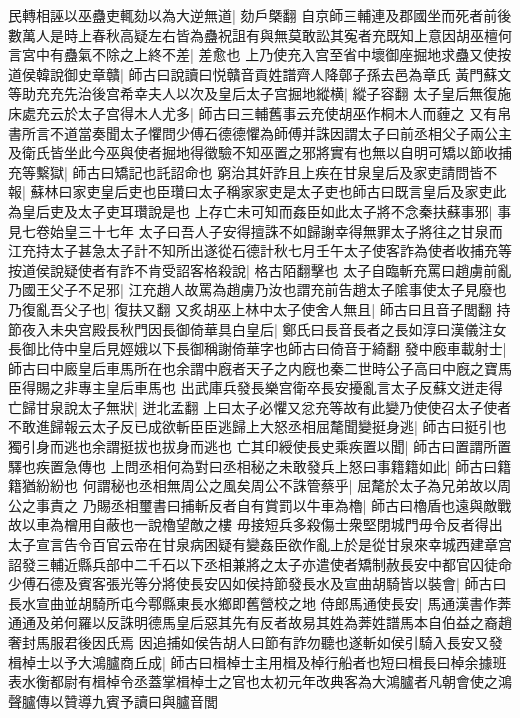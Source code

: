 民轉相誣以巫蠱吏輒劾以為大逆無道|{
	劾戶槩翻}
自京師三輔連及郡國坐而死者前後數萬人是時上春秋高疑左右皆為蠱祝詛有與無莫敢訟其寃者充既知上意因胡巫檀何言宮中有蠱氣不除之上終不差|{
	差愈也}
上乃使充入宫至省中壞御座掘地求蠱又使按道侯韓說御史章贛|{
	師古曰說讀曰悦贛音貢姓譜齊人降鄣子孫去邑為章氏}
黃門蘇文等助充充先治後宫希幸夫人以次及皇后太子宫掘地縱横|{
	縱子容翻}
太子皇后無復施床處充云於太子宫得木人尤多|{
	師古曰三輔舊事云充使胡巫作桐木人而薶之}
又有帛書所言不道當奏聞太子懼問少傅石德德懼為師傅并誅因謂太子曰前丞相父子兩公主及衛氏皆坐此今巫與使者掘地得徵驗不知巫置之邪將實有也無以自明可矯以節收捕充等繫獄|{
	師古曰矯記也託詔命也}
窮治其奸詐且上疾在甘泉皇后及家吏請問皆不報|{
	蘇林曰家吏皇后吏也臣瓚曰太子稱家家吏是太子吏也師古曰既言皇后及家吏此為皇后吏及太子吏耳瓚說是也}
上存亡未可知而姦臣如此太子將不念秦扶蘇事邪|{
	事見七卷始皇三十七年}
太子曰吾人子安得擅誅不如歸謝幸得無罪太子將往之甘泉而江充持太子甚急太子計不知所出遂從石德計秋七月壬午太子使客詐為使者收捕充等按道侯說疑使者有詐不肯受詔客格殺說|{
	格古陌翻擊也}
太子自臨斬充罵曰趙虜前亂乃國王父子不足邪|{
	江充趙人故罵為趙虜乃汝也謂充前告趙太子隂事使太子見廢也}
乃復亂吾父子也|{
	復扶又翻}
又炙胡巫上林中太子使舍人無且|{
	師古曰且音子閭翻}
持節夜入未央宫殿長秋門因長御倚華具白皇后|{
	鄭氏曰長音長者之長如淳曰漢儀注女長御比侍中皇后見娙娥以下長御稱謝倚華字也師古曰倚音于綺翻}
發中廏車載射士|{
	師古曰中廄皇后車馬所在也余謂中廐者天子之内廐也秦二世時公子高曰中廐之寶馬臣得賜之非專主皇后車馬也}
出武庫兵發長樂宫衛卒長安擾亂言太子反蘇文迸走得亡歸甘泉說太子無狀|{
	迸北孟翻}
上曰太子必懼又忿充等故有此變乃使使召太子使者不敢進歸報云太子反已成欲斬臣臣逃歸上大怒丞相屈氂聞變挺身逃|{
	師古曰挺引也獨引身而逃也余謂挺拔也拔身而逃也}
亡其印綬使長史乘疾置以聞|{
	師古曰置謂所置驛也疾置急傳也}
上問丞相何為對曰丞相秘之未敢發兵上怒曰事籍籍如此|{
	師古曰籍籍猶紛紛也}
何謂秘也丞相無周公之風矣周公不誅管蔡乎|{
	屈氂於太子為兄弟故以周公之事責之}
乃賜丞相璽書曰捕斬反者自有賞罰以牛車為櫓|{
	師古曰櫓盾也遠與敵戰故以車為橧用自蔽也一說櫓望敵之樓}
毋接短兵多殺傷士衆堅閉城門毋令反者得出太子宣言告令百官云帝在甘泉病困疑有變姦臣欲作亂上於是從甘泉來幸城西建章宫詔發三輔近縣兵部中二千石以下丞相兼將之太子亦遣使者矯制赦長安中都官囚徒命少傅石德及賓客張光等分將使長安囚如侯持節發長水及宣曲胡騎皆以裝會|{
	師古曰長水宣曲並胡騎所屯今鄠縣東長水鄉即舊營校之地}
侍郎馬通使長安|{
	馬通漢書作莾通通及弟何羅以反誅明德馬皇后惡其先有反者故易其姓為莾姓譜馬本自伯益之裔趙奢封馬服君後因氏焉}
因追捕如侯告胡人曰節有詐勿聽也遂斬如侯引騎入長安又發楫棹士以予大鴻臚商丘成|{
	師古曰楫棹士主用楫及棹行船者也短曰楫長曰棹余據班表水衡都尉有楫棹令丞蓋掌楫棹士之官也太初元年改典客為大鴻臚者凡朝會使之鴻聲臚傳以贊導九賓予讀曰與臚音閭}
